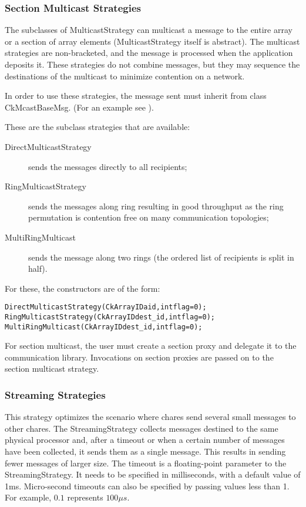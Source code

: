 {\subsubsection{Section Multicast Strategies}

The subclasses of MulticastStrategy can multicast a message to the entire array
or a section of array elements (MulticastStrategy itself is abstract). The
multicast strategies are non-bracketed, and the message is processed when the
application deposits it. These strategies do not combine messages, but they may
sequence the destinations of the multicast to minimize contention on a network.

In order to use these strategies, the message sent must inherit from class
{\textrm{CkMcastBaseMsg}}. (For an example see
).

These are the subclass strategies that are available:

\begin{description}
\item[DirectMulticastStrategy] sends the messages directly to all recipients;
\item[RingMulticastStrategy] sends the messages along ring resulting in good throughput as the ring permutation is contention free on many communication topologies;
\item[MultiRingMulticast] sends the message along two rings (the ordered list of recipients is split in half).
\end{description}

For these, the constructors are of the form:

\begin{alltt}
DirectMulticastStrategy(CkArrayID aid, int flag=0);
RingMulticastStrategy(CkArrayID dest_id, int flag=0);
MultiRingMulticast(CkArrayID dest_id, int flag=0);
\end{alltt}

For section multicast, the user must create a section proxy and delegate it to
the communication library. Invocations on section proxies are passed on to the
section multicast strategy.


\subsubsection{Streaming Strategies}

This strategy optimizes the scenario where chares send several small messages to
other chares. The StreamingStrategy collects messages destined to the same
physical processor and, after a timeout or when a certain number of messages
have been collected, it sends them as a single message. This results in sending
fewer messages of larger size. The timeout is a floating-point parameter to the
StreamingStrategy. It needs to be specified in milliseconds, with a default
value of 1ms. Micro-second timeouts can also be specified by passing values less
than 1. For example, $0.1$ represents $100\mu s$.

}

